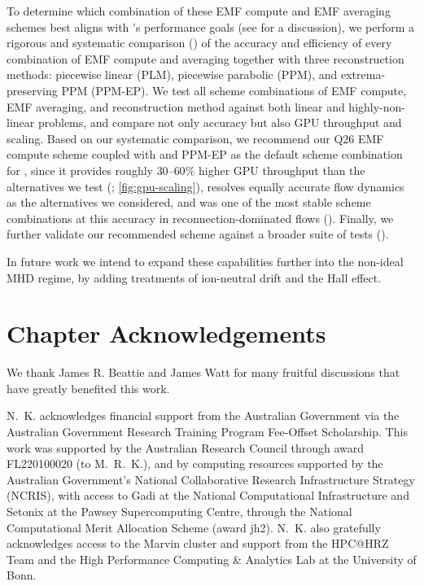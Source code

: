 To determine which combination of these EMF compute and EMF averaging schemes best aligns with \quokka's performance goals (see  for a discussion), we perform a rigorous and systematic comparison () of the accuracy and efficiency of every combination of EMF compute and averaging together with three reconstruction methods: piecewise linear (PLM), piecewise parabolic (PPM), and extrema-preserving PPM (PPM-EP). We test all scheme combinations of EMF compute, EMF averaging, and reconstruction method against both linear and highly-non-linear problems, and compare not only accuracy but also GPU throughput and scaling. Based on our systematic comparison, we recommend our Q26 EMF compute scheme coupled with  and PPM-EP as the default scheme combination for \quokka, since it provides roughly $30$--$60\%$ higher GPU throughput than the alternatives we test (; \cref{fig:gpu-scaling}), resolves equally accurate flow dynamics as the alternatives we considered, and was one of the most stable scheme combinations at this accuracy in reconnection-dominated flows (). Finally, we further validate our recommended scheme against a broader suite of tests ().

In future work we intend to expand these capabilities further into the non-ideal MHD regime, by adding treatments of ion-neutral drift and the Hall effect.


\section*{Chapter Acknowledgements}

We thank James R. Beattie and James Watt for many fruitful discussions that have greatly benefited this work.

N.~K. acknowledges financial support from the Australian Government via the Australian Government Research Training Program Fee-Offset Scholarship. This work was supported by the Australian Research Council through award FL220100020 (to M.~R.~K.), and by computing resources supported by the Australian Government's National Collaborative Research Infrastructure Strategy (NCRIS), with access to Gadi at the National Computational Infrastructure and Setonix at the Pawsey Supercomputing Centre, through the National Computational Merit Allocation Scheme (award jh2). N.~K. also gratefully acknowledges access to the Marvin cluster and support from the HPC@HRZ Team and the High Performance Computing \& Analytics Lab at the University of Bonn.

